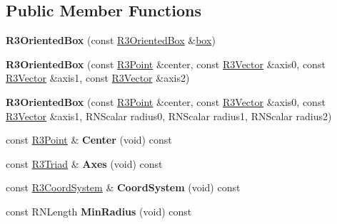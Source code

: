 \subsection*{Public Member Functions}
\begin{DoxyCompactItemize}
\item 
{\bfseries R3\+Oriented\+Box} (const \hyperlink{class_r3_oriented_box}{R3\+Oriented\+Box} \&\hyperlink{structbox}{box})\hypertarget{class_r3_oriented_box_a2289e108730b037d661682cd00c52963}{}\label{class_r3_oriented_box_a2289e108730b037d661682cd00c52963}

\item 
{\bfseries R3\+Oriented\+Box} (const \hyperlink{class_r3_point}{R3\+Point} \&center, const \hyperlink{class_r3_vector}{R3\+Vector} \&axis0, const \hyperlink{class_r3_vector}{R3\+Vector} \&axis1, const \hyperlink{class_r3_vector}{R3\+Vector} \&axis2)\hypertarget{class_r3_oriented_box_a7aedb602e10faab8d73c48601cc17ad1}{}\label{class_r3_oriented_box_a7aedb602e10faab8d73c48601cc17ad1}

\item 
{\bfseries R3\+Oriented\+Box} (const \hyperlink{class_r3_point}{R3\+Point} \&center, const \hyperlink{class_r3_vector}{R3\+Vector} \&axis0, const \hyperlink{class_r3_vector}{R3\+Vector} \&axis1, R\+N\+Scalar radius0, R\+N\+Scalar radius1, R\+N\+Scalar radius2)\hypertarget{class_r3_oriented_box_a741128e4f66d74121d914d7d56d9d29a}{}\label{class_r3_oriented_box_a741128e4f66d74121d914d7d56d9d29a}

\item 
const \hyperlink{class_r3_point}{R3\+Point} \& {\bfseries Center} (void) const \hypertarget{class_r3_oriented_box_ae263d49700476287b856b59bb16922ac}{}\label{class_r3_oriented_box_ae263d49700476287b856b59bb16922ac}

\item 
const \hyperlink{class_r3_triad}{R3\+Triad} \& {\bfseries Axes} (void) const \hypertarget{class_r3_oriented_box_ae83a2a1a1bf70cbd81c64d53c00157c3}{}\label{class_r3_oriented_box_ae83a2a1a1bf70cbd81c64d53c00157c3}

\item 
const \hyperlink{class_r3_coord_system}{R3\+Coord\+System} \& {\bfseries Coord\+System} (void) const \hypertarget{class_r3_oriented_box_aa1705e61cd31720ea447e71fc4c1caf0}{}\label{class_r3_oriented_box_aa1705e61cd31720ea447e71fc4c1caf0}

\item 
const R\+N\+Length {\bfseries Min\+Radius} (void) const \hypertarget{class_r3_oriented_box_aab76939f941137e503dba9a0bae78b68}{}\label{class_r3_oriented_box_aab76939f941137e503dba9a0bae78b68}


\end{DoxyCompactItemize}
